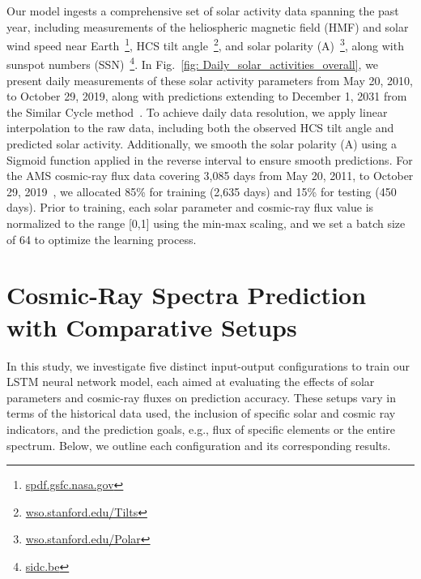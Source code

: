 \documentclass[twocolumn,,12pt]{aastex631}
\begin{document}
Our model ingests a comprehensive set of solar activity data spanning the past year, including measurements of the heliospheric magnetic field (HMF) and solar wind speed near Earth~\footnote{\href{https://spdf.gsfc.nasa.gov/pub/data/omni/low_res_omni/}{spdf.gsfc.nasa.gov}
}, HCS tilt angle~\footnote{\href{http://wso.stanford.edu/Tilts.html}{wso.stanford.edu/Tilts}}, and solar polarity (A)~\footnote{\href{http://wso.stanford.edu/Polar.html}{wso.stanford.edu/Polar}}, along with sunspot numbers (SSN)~\footnote{\href{https://www.sidc.be/SILSO/datafiles}{sidc.be}}. In Fig.~\ref{fig: Daily_solar_activities_overall}, we present daily measurements of these solar activity parameters from May 20, 2010, to October 29, 2019, along with predictions extending to December 1, 2031 from the Similar Cycle method~\cite{PredictionOnsetSolarCycle24,ssncycle24,solarcycle25,miao2020prediction}. To achieve daily data resolution, we apply linear interpolation to the raw data, including both the observed HCS tilt angle and predicted solar activity. Additionally, we smooth the solar polarity (A) using a Sigmoid function applied in the reverse interval to ensure smooth predictions. For the AMS cosmic-ray flux data covering 3,085 days from May 20, 2011, to October 29, 2019~\cite{aguilar2022properties}, we allocated 85\% for training (2,635 days) and 15\% for testing (450 days). Prior to training, each solar parameter and cosmic-ray flux value is normalized to the range [0,1] using the min-max scaling, and we set a batch size of 64 to optimize the learning process.


\section{Cosmic-Ray Spectra Prediction with Comparative Setups}

In this study, we investigate five distinct input-output configurations to train our LSTM neural network model, each aimed at evaluating the effects of solar parameters and cosmic-ray fluxes on prediction accuracy. These setups vary in terms of the historical data used, the inclusion of specific solar and cosmic ray indicators, and the prediction goals, e.g., flux of specific elements or the entire spectrum. Below, we outline each configuration and its corresponding results.
\end{document}
